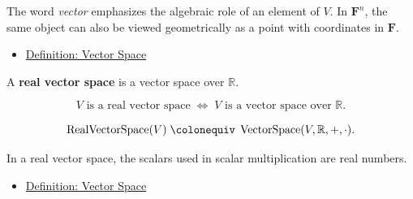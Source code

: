 \begin{remark*}[Interpretation]
The word \emph{vector} emphasizes the algebraic role of an element of $V$.
In $\mathbf{F}^n$, the same object can also be viewed geometrically as a point
with coordinates in $\mathbf{F}$.
\end{remark*}

\begin{remark*}[Dependencies]
\begin{itemize}
  \item \hyperref[def:vector-space]{Definition: Vector Space}
\end{itemize}
\end{remark*}


\begin{tcolorbox}[colback=defbox, colframe=defborder, arc=2pt,
  left=6pt, right=6pt, top=4pt, bottom=4pt,
  title={\small\textbf{Definition (Real Vector Space)}},
  fonttitle=\small\bfseries]
\begin{definition}
\label{def:real-vector-space}
A \textbf{real vector space} is a vector space over $\mathbb{R}$.
\end{definition}
\end{tcolorbox}

\begin{remark*}
\[
V \text{ is a real vector space}
\;\Longleftrightarrow\;
V \text{ is a vector space over } \mathbb{R}.
\]
\end{remark*}

\begin{remark*}
\[
\operatorname{RealVectorSpace}(V)
\;\colonequiv\;
\operatorname{VectorSpace}(V,\mathbb{R},+,\cdot).
\]
\end{remark*}

\begin{remark*}[Interpretation]
In a real vector space, the scalars used in scalar multiplication are real numbers.
\end{remark*}

\begin{remark*}[Dependencies]
\begin{itemize}
  \item \hyperref[def:vector-space]{Definition: Vector Space}
\end{itemize}
\end{remark*}

